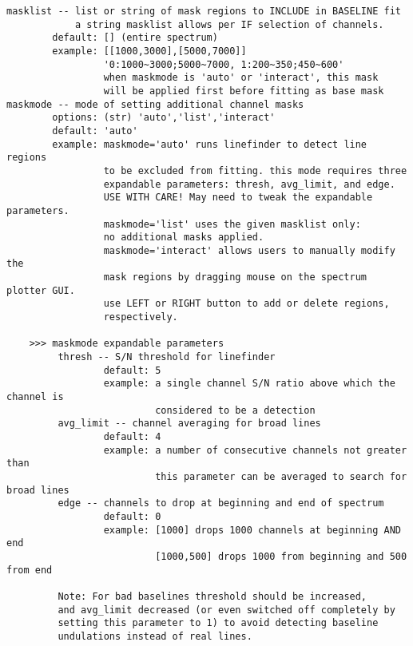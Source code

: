 \begin{verbatim}
masklist -- list or string of mask regions to INCLUDE in BASELINE fit
            a string masklist allows per IF selection of channels.
        default: [] (entire spectrum)
        example: [[1000,3000],[5000,7000]]
                 '0:1000~3000;5000~7000, 1:200~350;450~600'
                 when maskmode is 'auto' or 'interact', this mask 
                 will be applied first before fitting as base mask
maskmode -- mode of setting additional channel masks
        options: (str) 'auto','list','interact'
        default: 'auto'
        example: maskmode='auto' runs linefinder to detect line regions 
                 to be excluded from fitting. this mode requires three 
                 expandable parameters: thresh, avg_limit, and edge.
                 USE WITH CARE! May need to tweak the expandable parameters.
                 maskmode='list' uses the given masklist only: 
                 no additional masks applied.
                 maskmode='interact' allows users to manually modify the 
                 mask regions by dragging mouse on the spectrum plotter GUI.
                 use LEFT or RIGHT button to add or delete regions, 
                 respectively.

    >>> maskmode expandable parameters
         thresh -- S/N threshold for linefinder
                 default: 5
                 example: a single channel S/N ratio above which the channel is
                          considered to be a detection
         avg_limit -- channel averaging for broad lines
                 default: 4
                 example: a number of consecutive channels not greater than
                          this parameter can be averaged to search for broad lines
         edge -- channels to drop at beginning and end of spectrum
                 default: 0
                 example: [1000] drops 1000 channels at beginning AND end
                          [1000,500] drops 1000 from beginning and 500 from end

         Note: For bad baselines threshold should be increased,
         and avg_limit decreased (or even switched off completely by
         setting this parameter to 1) to avoid detecting baseline
         undulations instead of real lines.


\end{verbatim}
